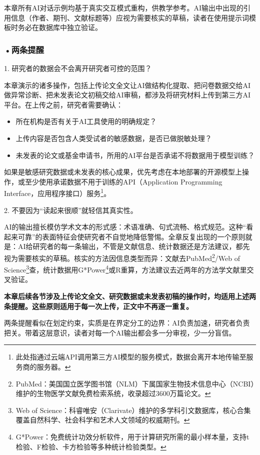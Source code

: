 本章所有AI对话示例均基于真实交互模式重构，供教学参考。AI输出中出现的引用信息（作者、期刊、文献标题等）应视为需要核实的草稿，读者在使用提示词模板时务必在数据库中独立验证。

\subsubsection*{\textbf{•两条提醒}}

1. 研究者的数据会不会离开研究者可控的范围？

本章演示的诸多操作，包括上传论文全文让AI做结构化提取、把问卷数据交给AI做异常诊断、把未发表论文初稿交给AI审稿，都涉及将研究材料上传到第三方AI平台。在上传之前，研究者需要确认：
\begin{itemize}[nosep]
\item 所在机构是否有关于AI工具使用的明确规定？
\item 上传内容是否包含人类受试者的敏感数据，是否已做脱敏处理？
\item 未发表的论文或基金申请书，所用的AI平台是否承诺不将数据用于模型训练？
\end{itemize}
如果是敏感研究数据或未发表的核心成果，优先考虑在本地部署的开源模型上操作，或至少使用承诺数据不用于训练的API（Application Programming Interface，应用程序接口）服务\footnote{此处指通过云端API调用第三方AI模型的服务模式，数据会离开本地传输至服务商的服务器。}。

2. 不要因为``读起来很顺''就轻信其真实性。

AI的输出擅长模仿学术文本的形式感：术语准确、句式流畅、格式规范。这种``看起来可靠''的表面特征会使研究者不自觉地降低警惕。全章反复出现的一个原则就是：AI给研究者的每一条输出，不管是文献信息、统计数据还是方法建议，都先视为需要核实的草稿。核实的方法因信息类型而异：文献去PubMed\footnote{PubMed：美国国立医学图书馆（NLM）下属国家生物技术信息中心（NCBI）维护的生物医学文献免费检索系统，收录超过3600万篇论文。}/Web of Science\footnote{Web of Science：科睿唯安（Clarivate）维护的多学科引文数据库，核心合集覆盖自然科学、社会科学和艺术人文领域的权威期刊。}查，统计数据用G*Power\footnote{G*Power：免费统计功效分析软件，用于计算研究所需的最小样本量，支持t检验、F检验、卡方检验等多种统计检验类型。}或R重算，方法建议去近两年的方法学文献里交叉验证。


\medskip
\textbf{本章后续各节涉及上传论文全文、研究数据或未发表初稿的操作时，均适用上述两条提醒。这些原则适用于每一次上传，正文中不再逐一重复。}

两条提醒看似在划定约束，实质是在界定分工的边界：AI负责加速，研究者负责把关。带着这层意识，读者对每一个AI输出都会多一分审视，少一分盲信。


